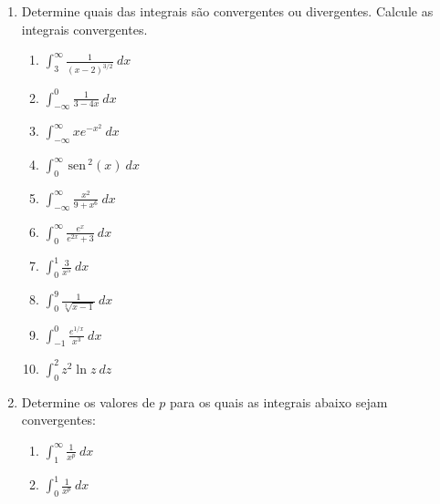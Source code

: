\documentclass[a4paper,5pt]{amsbook}
\newcommand{\sen}{\,\mbox{sen}\,}
\newcommand{\ds}{\displaystyle}
\begin{document}
\vspace{1cm}
\begin{enumerate}
	\vspace{0.5cm}
	\item Determine quais das integrais s\~ao convergentes ou divergentes.
		Calcule as integrais convergentes.
		\begin{enumerate}
			\vspace{0.3cm}
			\item $\ds\int_3^\infty \frac{1}{{(x-2)}^{3/2}}\ dx$
			\vspace{0.3cm}
			\item $\ds\int_{-\infty}^0 \frac{1}{3-4x}\ dx$
			\vspace{0.3cm}
			\item $\ds\int_{-\infty}^\infty x e^{-x^2}\ dx$
			\vspace{0.3cm}
			\item $\ds\int_0^\infty \sen^2(x)\ dx$
			\vspace{0.3cm}
			\item $\ds\int_{-\infty}^\infty \frac{x^2}{9+x^6}\ dx$
			\vspace{0.3cm}
			\item $\ds\int_0^\infty \frac{e^x}{e^{2x}+3}\ dx$
			\vspace{0.3cm}
			\item $\ds\int_0^1 \frac{3}{x^5}\ dx$
			\vspace{0.3cm}
			\item $\ds\int_0^9 \frac{1}{\sqrt[3]{x-1}}\ dx$
			\vspace{0.3cm}
			\item $\ds\int_{-1}^0 \frac{e^{1/x}}{x^3} \ dx$
			\vspace{0.3cm}
			\item $\ds\int_0^2 z^2 \ln{z} \ dz$
		\end{enumerate}

	\vspace{0.5cm}
	\item Determine os valores de $p$ para os quais as integrais abaixo sejam
		convergentes:
		\begin{enumerate}
			\vspace{0.3cm}
			\item $\ds\int_1^\infty \frac{1}{x^p}\ dx$
			\vspace{0.3cm}
			\item $\ds\int_0^1 \frac{1}{x^p}\ dx$
		\end{enumerate}
\end{enumerate}
\end{document}
